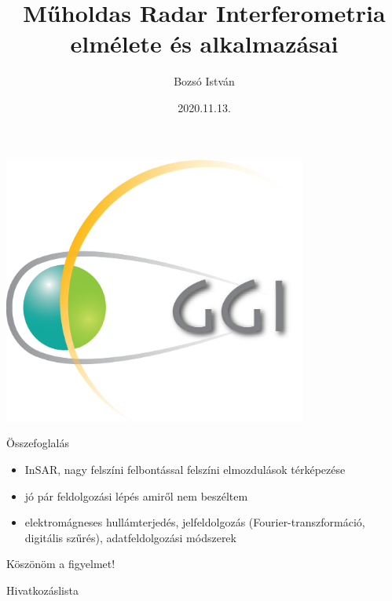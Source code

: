 \documentclass[aspectratio=169]{beamer}
\title[Műholdas Távérzékelés Labor, 2019/20.I.]{Műholdas Radar Interferometria elmélete és alkalmazásai}
\author[Bozsó István]{Bozsó István}
\institute[ELKH CSFK GGI]{ELKH CSFK Geodéziai és Geofizikai Intézet}
\date{2020.11.13.}
\begin{document}
\begin{frame}
    \titlepage
    \begin{center}
        \begin{minipage}[c]{0.3\textwidth}
            \includegraphics[width=0.75\textwidth]{logos/ggi.png}
        \end{minipage}
    \end{center}
\end{frame}










\begin{frame}{Összefoglalás}
    \begin{itemize}
        \item InSAR, nagy felszíni felbontással felszíni elmozdulások térképezése
        \item jó pár feldolgozási lépés amiről nem beszéltem
        \item elektromágneses hullámterjedés, jelfeldolgozás (Fourier-transzformáció, digitális szűrés), adatfeldolgozási módszerek
    \end{itemize}
\end{frame}

\begin{frame}
    \begin{center}
        \Huge \color{blue!55!black}
        Köszönöm a figyelmet!
    \end{center}
\end{frame}

\begin{frame}[allowframebreaks]{Hivatkozáslista}
    
\end{frame}
\end{document}
